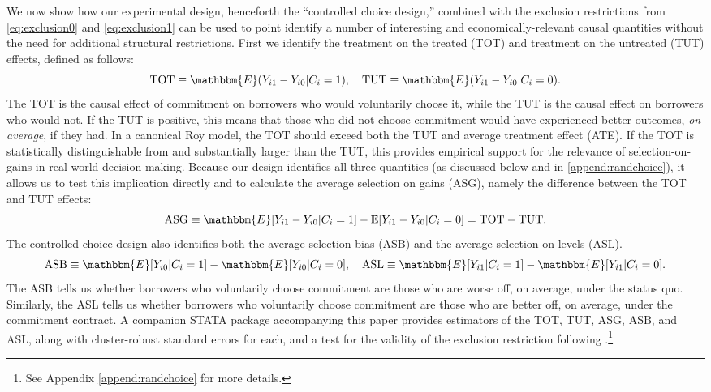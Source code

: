 \documentclass[ecta,nameyear,final]{econsocart}
\begin{document}
We now show how our experimental design, henceforth the ``controlled choice design,'' combined with the exclusion restrictions from \eqref{eq:exclusion0} and \eqref{eq:exclusion1} can be used to point identify a number of interesting and economically-relevant causal quantities without the need for additional structural restrictions.
First we identify the treatment on the treated (TOT) and treatment on the untreated (TUT) effects, defined as follows:
\[
\text{TOT} \equiv \mathbbm{E}(Y_{i1} - Y_{i0} | C_i = 1), \quad
\text{TUT} \equiv \mathbbm{E}(Y_{i1} - Y_{i0} | C_i = 0).
\]
The TOT is the causal effect of commitment on borrowers who would voluntarily choose it, while the TUT is the causal effect on borrowers who would not.
If the TUT is positive, this means that those who did not choose commitment would have experienced better outcomes, \emph{on average}, if they had. 
In a canonical Roy model, the TOT should exceed both the TUT and average treatment effect (ATE).
If the TOT is statistically distinguishable from and substantially larger than the TUT, this provides empirical support for the relevance of selection-on-gains in real-world decision-making.
Because our design identifies all three quantities (as discussed below and in  \ref{append:randchoice}), it allows us to test this implication directly and to calculate the average selection on gains (ASG), namely the difference between the TOT and TUT effects:
\[
\text{ASG} \equiv \mathbbm{E}[Y_{i1} - Y_{i0}|C_i = 1] - \mathbb{E}[Y_{i1} - Y_{i0} | C_i = 0] = \text{TOT} - \text{TUT}.
\]
The controlled choice design also identifies both the average selection bias (ASB) and the average selection on levels (ASL). 
\[
\text{ASB} \equiv \mathbbm{E}[Y_{i0}|C_i = 1] - \mathbbm{E}[Y_{i0}|C_i = 0], \quad 
\text{ASL} \equiv \mathbbm{E}[Y_{i1}|C_i = 1] - \mathbbm{E}[Y_{i1}|C_i = 0].
\]
The ASB tells us whether borrowers who voluntarily choose commitment are those who are worse off, on average, under the status quo.
Similarly, the ASL tells us whether borrowers who voluntarily choose commitment are those who are better off, on average, under the commitment contract.
A companion STATA package accompanying this paper provides estimators of the TOT, TUT, ASG, ASB, and ASL, along with cluster-robust standard errors for each, and a test for the validity of the exclusion restriction following \cite{huber_mellace}.\footnote{See Appendix \ref{append:randchoice} for more details.}
\end{document}
